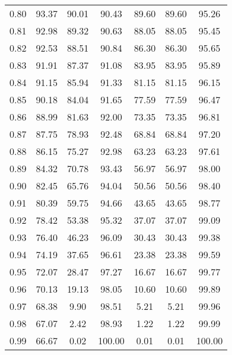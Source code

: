 \begin{tabular}{|c|c|c|c|c|c|c|}
      0.80 &     93.37 &     90.01 &      90.43 &   89.60 &      89.60 &         95.26 \\
      0.81 &     92.98 &     89.32 &      90.63 &   88.05 &      88.05 &         95.45 \\
      0.82 &     92.53 &     88.51 &      90.84 &   86.30 &      86.30 &         95.65 \\
      0.83 &     91.91 &     87.37 &      91.08 &   83.95 &      83.95 &         95.89 \\
      0.84 &     91.15 &     85.94 &      91.33 &   81.15 &      81.15 &         96.15 \\
      0.85 &     90.18 &     84.04 &      91.65 &   77.59 &      77.59 &         96.47 \\
      0.86 &     88.99 &     81.63 &      92.00 &   73.35 &      73.35 &         96.81 \\
      0.87 &     87.75 &     78.93 &      92.48 &   68.84 &      68.84 &         97.20 \\
      0.88 &     86.15 &     75.27 &      92.98 &   63.23 &      63.23 &         97.61 \\
      0.89 &     84.32 &     70.78 &      93.43 &   56.97 &      56.97 &         98.00 \\
      0.90 &     82.45 &     65.76 &      94.04 &   50.56 &      50.56 &         98.40 \\
      0.91 &     80.39 &     59.75 &      94.66 &   43.65 &      43.65 &         98.77 \\
      0.92 &     78.42 &     53.38 &      95.32 &   37.07 &      37.07 &         99.09 \\
      0.93 &     76.40 &     46.23 &      96.09 &   30.43 &      30.43 &         99.38 \\
      0.94 &     74.19 &     37.65 &      96.61 &   23.38 &      23.38 &         99.59 \\
      0.95 &     72.07 &     28.47 &      97.27 &   16.67 &      16.67 &         99.77 \\
      0.96 &     70.13 &     19.13 &      98.05 &   10.60 &      10.60 &         99.89 \\
      0.97 &     68.38 &      9.90 &      98.51 &    5.21 &       5.21 &         99.96 \\
      0.98 &     67.07 &      2.42 &      98.93 &    1.22 &       1.22 &         99.99 \\
      0.99 &     66.67 &      0.02 &     100.00 &    0.01 &       0.01 &        100.00 \\
\bottomrule
\end{tabular}
